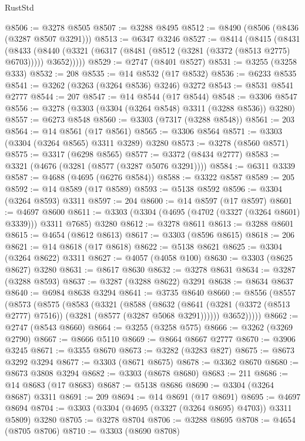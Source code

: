 \begin{lexlean}{RustStd}
\begin{coremodule}
{\begin{coremodule}
{{{{{{{{{{{{{{{{{{{{{{{{{{{{{{{{{@8506 := @3278 @8505
@8507 := @3288 @8495
@8512 := @8490 (@8506 (@8436 (@3287 @8507 @3291)))
@8513 := @6347 @3246
@8527 := @8414
    (@8415
      (@8431
        (@8433 (@8440 (@3321 (@6317 (@8481 (@8512 (@3281 (@3372 (@8513 @2775) @6703))))) @3652)))))
@8529 := @2747 (@8401 @8527)
@8531 := @3255 (@3258 @333)
@8532 := 208
@8535 := @14 @8532 (@17 @8532)
@8536 := @6233 @8535
@8541 := @3262 (@3263 (@3264 @8536) @3246) @3272
@8543 := @8531 @8541 @2777
@8544 := 207
@8547 := @14 @8544 (@17 @8544)
@8548 := @3306 @8547
@8556 := @3278 (@3303 (@3304 (@3264 @8548) @3311 (@3288 @8536)) @3280)
@8557 := @6273 @8548
@8560 := @3303 (@7317 (@3288 @8548))
@8561 := 203
@8564 := @14 @8561 (@17 @8561)
@8565 := @3306 @8564
@8571 := @3303 (@3304 (@3264 @8565) @3311 @3289) @3280
@8573 := @3278 (@8560 @8571)
@8575 := @3317 (@6298 @8565)
@8577 := @3372 (@8434 @2777)
@8583 := @3321 (@4676 (@3281 (@8577 (@3287 @5076 @3291))))
@8584 := @6311 @3339
@8587 := @4688 (@4695 (@6276 @8584))
@8588 := @3322 @8587
@8589 := 205
@8592 := @14 @8589 (@17 @8589)
@8593 := @5138 @8592
@8596 := @3304 (@3264 @8593) @3311
@8597 := 204
@8600 := @14 @8597 (@17 @8597)
@8601 := @4697 @8600
@8611 := @3303 (@3304 (@4695 (@4702 (@3327 (@3264 @8601) @3339))) @3311 @7685) @3280
@8612 := @3278 @8611
@8613 := @3288 @8601
@8615 := @4654 (@8612 @8613)
@8617 := @3303 (@8596 @8615)
@8618 := 206
@8621 := @14 @8618 (@17 @8618)
@8622 := @5138 @8621
@8625 := @3304 (@3264 @8622) @3311
@8627 := @4057 (@4058 @100)
@8630 := @3303 (@8625 @8627) @3280
@8631 := @8617 @8630
@8632 := @3278 @8631
@8634 := @3287 (@3288 @8593)
@8637 := @3287 (@3288 @8622) @3291
@8638 := @8634 @8637
@8640 := @6984 @8638 @3294
@8641 := @3735 @8640
@8660 := @8556
    (@8557
      (@8573
        (@8575
          (@8583
            (@3321
              (@8588
                (@8632
                  (@8641 (@3281 (@3372 (@8513 @2777) @7516)) (@3281 (@8577 (@3287 @5068 @3291))))))
              @3652)))))
@8662 := @2747 (@8543 @8660)
@8664 := @3255 (@3258 @575)
@8666 := @3262 (@3269 @2790)
@8667 := @8666 @5110
@8669 := @8664 @8667 @2777
@8670 := @3906 @3245
@8671 := @3355 @8670
@8673 := @3282 (@3283 @827)
@8675 := @8673 @3292 @3294
@8677 := @3303 (@8671 @8675)
@8678 := @3362 @8670
@8680 := @8673 @3808 @3294
@8682 := @3303 (@8678 @8680)
@8683 := 211
@8686 := @14 @8683 (@17 @8683)
@8687 := @5138 @8686
@8690 := @3304 (@3264 @8687) @3311
@8691 := 209
@8694 := @14 @8691 (@17 @8691)
@8695 := @4697 @8694
@8704 := @3303 (@3304 (@4695 (@3327 (@3264 @8695) @4703)) @3311 @5809) @3280
@8705 := @3278 @8704
@8706 := @3288 @8695
@8708 := @4654 (@8705 @8706)
@8710 := @3303 (@8690 @8708)
}}}}}}}}}}}}}}}}}}}}}}}}}}}}}}}}}
\end{coremodule}}
\end{coremodule}
\end{lexlean}
